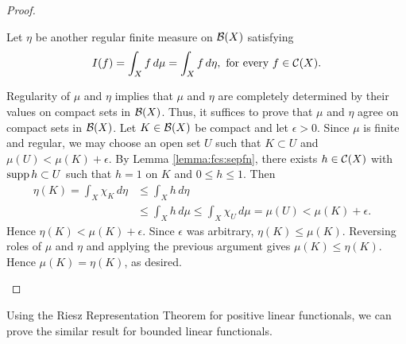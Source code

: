 \begin{proof}
\begin{step}[Uniqueness]
Let $\eta$ be another regular finite measure on ${\mathcal B}(X)$ satisfying \begin{align*}
    I(f) = \int_{X} f \,d \mu = \int_{X} f \,d \eta , \text {   for every $f \in {\mathcal C}(X).$}
\end{align*}

Regularity of $\mu$ and $\eta$ implies that $\mu$ and $\eta$ are completely determined by their values on compact sets in ${\mathcal B}(X)$. Thus, it suffices to prove that $\mu$ and $\eta$ agree on compact sets in ${\mathcal B}(X)$. Let $K \in {\mathcal B}(X)$ be compact and let $\epsilon > 0$. Since $\mu$ is finite and regular, we may choose an open set $U $ such that $ K \subset U$ and $\mu(U) < \mu(K) + \epsilon$.
By Lemma \ref{lemma:fcs:sepfn}, there exists $h \in {\mathcal C}(X)$ with $\operatorname{supp} h \subset U$ such that $h = 1$ on $K$ and $0 \leq h \leq 1$.
Then \begin{align*}
    \eta (K) = \int_X \chi_{K} \,d\eta &\leq \int_X h \,d\eta & \\
             &\leq  \int_X h \,d\mu \leq  \int_X \chi_{U} \,d\mu = \mu(U) < \mu(K) + \epsilon. 
\end{align*}
Hence $\eta(K) < \mu(K) + \epsilon$. Since $\epsilon$ was arbitrary, $\eta(K) \leq \mu(K)$. Reversing roles of $\mu$ and $\eta$ and applying the previous argument gives $\mu(K) \leq \eta(K)$. Hence $\mu(K) = \eta(K)$, as desired.
\end{step}
\end{proof}

Using the Riesz Representation Theorem for positive linear functionals, we can prove the similar result for bounded linear functionals.


